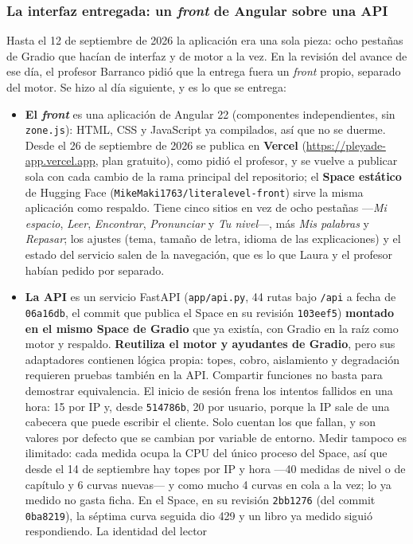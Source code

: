 \documentclass[11pt,a4paper]{article}
\newcommand{\cod}[1]{\texttt{\small #1}}
\begin{document}
\subsubsection{La interfaz entregada: un \emph{front} de Angular sobre una API}
\label{sec:front}

Hasta el 12 de septiembre de 2026 la aplicación era una sola pieza: ocho pestañas de
Gradio que hacían de interfaz y de motor a la vez. En la revisión del avance de ese día,
el profesor Barranco pidió que la entrega fuera un \emph{front} propio, separado del
motor. Se hizo al día siguiente, y es lo que se entrega:

\begin{itemize}
  \item \textbf{El \emph{front}} es una aplicación de Angular 22 (componentes
        independientes, sin \cod{zone.js}): HTML, CSS y JavaScript ya compilados, así que
        no se duerme. Desde el 26 de septiembre de 2026 se publica en \textbf{Vercel}
        (\url{https://pleyade-app.vercel.app}, plan gratuito), como pidió el profesor, y se
        vuelve a publicar sola con cada cambio de la rama principal del repositorio; el
        \textbf{Space estático} de Hugging Face (\cod{MikeMaki1763/\allowbreak literalevel-front})
        sirve la misma aplicación como respaldo. Tiene cinco sitios en vez de ocho
        pestañas —\emph{Mi espacio}, \emph{Leer}, \emph{Encontrar}, \emph{Pronunciar} y
        \emph{Tu nivel}—, más \emph{Mis palabras} y \emph{Repasar}; los ajustes (tema,
        tamaño de letra, idioma de las explicaciones) y el estado del servicio salen de la navegación, que es lo que
        Laura y el profesor habían pedido por separado.
  \item \textbf{La API} es un servicio FastAPI (\cod{app/api.py}, 44 rutas bajo \cod{/api} a fecha de \cod{06a16db}, el commit que publica el Space en su revisión \cod{103eef5}) \textbf{montado en el mismo Space de Gradio} que ya existía, con Gradio
        en la raíz como motor y respaldo. \textbf{Reutiliza el motor y ayudantes de Gradio},
        pero sus adaptadores contienen lógica propia: topes, cobro, aislamiento y
        degradación requieren pruebas también en la API. Compartir funciones no basta
        para demostrar equivalencia. El inicio de sesión frena los intentos fallidos en una hora: 15 por IP
        y, desde \cod{514786b}, 20 por usuario, porque la IP sale de una cabecera que
        puede escribir el cliente. Solo cuentan los que fallan, y son valores por
        defecto que se cambian por variable de entorno. Medir tampoco es ilimitado: cada medida ocupa la CPU del único proceso del Space, así que desde el 14 de septiembre hay topes por IP y hora ---40 medidas de nivel o de capítulo y 6 curvas nuevas--- y como mucho 4 curvas en cola a la vez; lo ya medido no gasta ficha. En el Space, en su revisión \cod{2bb1276} (del commit \cod{0ba8219}), la séptima curva seguida dio 429 y un libro ya medido siguió respondiendo. La identidad del lector

\end{itemize}
\end{document}
